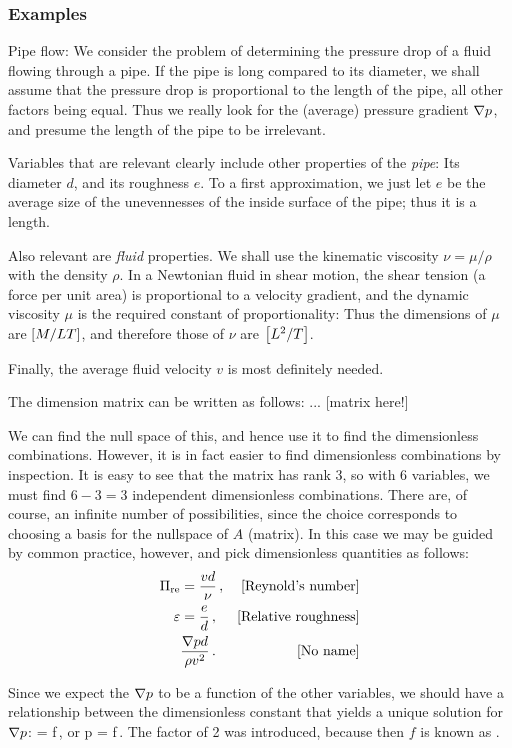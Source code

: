 \subsubsection{Examples}
Pipe flow: We consider the problem of determining the pressure drop of a fluid flowing through a pipe. If the pipe is long compared to its diameter, we shall assume that the pressure drop is proportional to the length of the pipe, all other factors being equal. Thus we really look for the (average) pressure gradient $\nabla p$, and presume the length of the pipe to be irrelevant.

Variables that are relevant clearly include other properties of the \emph{pipe}: Its diameter $d$, and its roughness $e$. To a first approximation, we just let $e$ be the average size of the unevennesses of the inside surface of the pipe; thus it is a length.

Also relevant are \emph{fluid} properties. We shall use the kinematic viscosity $\nu = \mu/\rho$ with the density $\rho$. In a Newtonian fluid in shear motion, the shear tension (a force per unit area) is proportional to a velocity gradient, and the dynamic viscosity $\mu$ is the required constant of proportionality: Thus the dimensions of $\mu$ are $\left[{M/LT}\right]$, and therefore those of $\nu$ are $\left[{L^2/T}\right]$. 

Finally, the average fluid velocity $v$ is most definitely needed.

The dimension matrix can be written as follows: ... [matrix here!]

We can find the null space of this, and hence use it to find the dimensionless combinations. However, it is in fact easier to find dimensionless combinations by inspection. It is easy to see that the matrix has rank 3, so with 6 variables, we must find $6 - 3 = 3$ independent dimensionless combinations. There are, of course, an infinite number of possibilities, since the choice corresponds to choosing a basis for the nullspace of $A$ (matrix). In this case we may be guided by common practice, however, and pick dimensionless quantities as follows:
\begin{align*}
       \Pi_\text{re} &= \dfrac{vd}{\nu}            \,,&\text{[{Reynold's number}]}\\
\varepsilon &= \dfrac{e}{d}               \,,&\text{[{Relative roughness}]}\\
         {} & \dfrac{\nabla p d}{\rho v^2}\,.&\text{[{No name}]}
\end{align*}

Since we expect the $\nabla p$ to be a function of the other variables, we should have a relationship between the dimensionless constant that yields a unique solution for $\nabla p$:
\beq
{} = f\vat{\rey, \varepsilon}\,,
\eeq
or
\beq
\gder p = f\vat{\rey, \varepsilon}\,.
\eeq
The factor of 2 was introduced, because then $f$ is known as .

